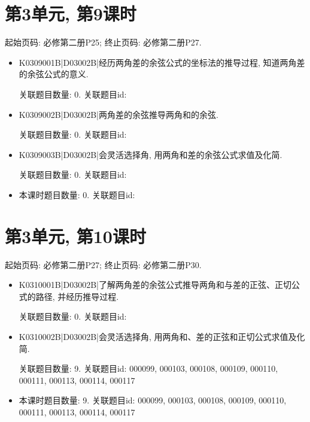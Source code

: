 \section*{第3单元, 第9课时}
起始页码: 必修第二册P25; 终止页码: 必修第二册P27.
\begin{itemize}
\item K0309001B|D03002B|经历两角差的余弦公式的坐标法的推导过程, 知道两角差的余弦公式的意义.

关联题目数量: 0. 关联题目id: 

\item K0309002B|D03002B|两角差的余弦推导两角和的余弦.

关联题目数量: 0. 关联题目id: 

\item K0309003B|D03002B|会灵活选择角, 用两角和差的余弦公式求值及化简.

关联题目数量: 0. 关联题目id: 

\item 本课时题目数量: 0. 关联题目id: 

\end{itemize}

\section*{第3单元, 第10课时}
起始页码: 必修第二册P27; 终止页码: 必修第二册P30.
\begin{itemize}
\item K0310001B|D03002B|了解两角差的余弦公式推导两角和与差的正弦、正切公式的路径, 并经历推导过程.

关联题目数量: 0. 关联题目id: 

\item K0310002B|D03002B|会灵活选择角, 用两角和、差的正弦和正切公式求值及化简.

关联题目数量: 9. 关联题目id: 000099, 000103, 000108, 000109, 000110, 000111, 000113, 000114, 000117

\item 本课时题目数量: 9. 关联题目id: 000099, 000103, 000108, 000109, 000110, 000111, 000113, 000114, 000117

\end{itemize}

